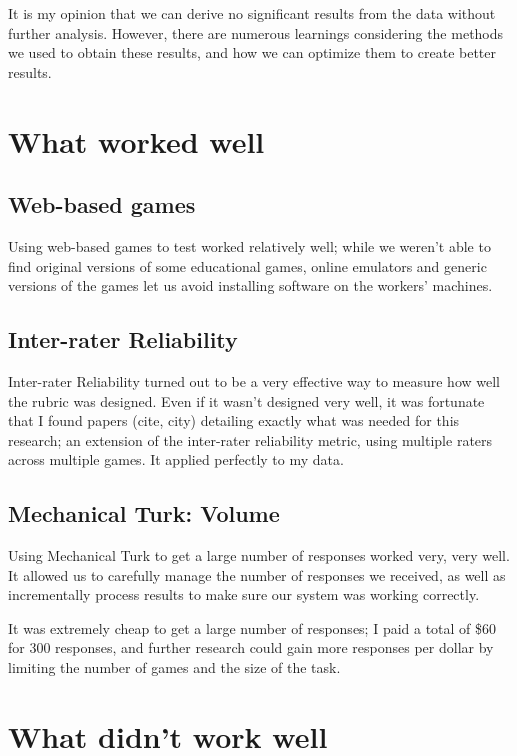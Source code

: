 \documentclass[12pt]{report}
\begin{document}
	It is my opinion that we can derive no significant results from the data without further analysis. However, there are numerous learnings considering the methods we used to obtain these results, and how we can optimize them to create better results.

	\section{What worked well}
		
		\subsection{Web-based games}

			Using web-based games to test worked relatively well; while we weren't able to find original versions of some educational games, online emulators and generic versions of the games let us avoid installing software on the workers' machines.

		\subsection{Inter-rater Reliability}

			Inter-rater Reliability turned out to be a very effective way to measure how well the rubric was designed. Even if it wasn't designed very well, it was fortunate that I found papers (cite, city) detailing exactly what was needed for this research; an extension of the inter-rater reliability metric, using multiple raters across multiple games. It applied perfectly to my data.

		\subsection{Mechanical Turk: Volume}

			Using Mechanical Turk to get a large number of responses worked very, very well. It allowed us to carefully manage the number of responses we received, as well as incrementally process results to make sure our system was working correctly. 

			It was extremely cheap to get a large number of responses; I paid a total of \$60 for 300 responses, and further research could gain more responses per dollar by limiting the number of games and the size of the task.


	\section{What didn't work well}
\end{document}

